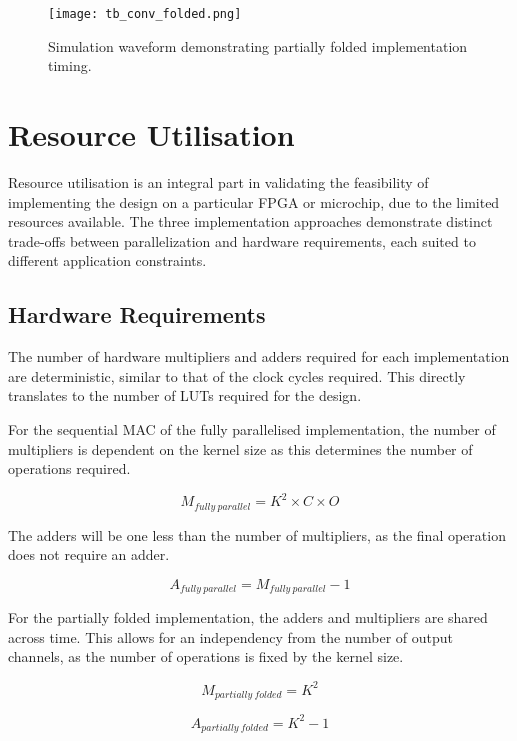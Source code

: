 \begin{figure}[h]
    \centering
    \texttt{[image: tb\_conv\_folded.png]}
    \caption{Simulation waveform demonstrating partially folded implementation timing.}
    \label{fig:sim_partial}
\end{figure}

\section{Resource Utilisation}
Resource utilisation is an integral part in validating the feasibility of implementing the design on a particular FPGA or microchip, due to the limited resources available. The three implementation approaches demonstrate distinct trade-offs between parallelization and hardware requirements, each suited to different application constraints.

\subsection{Hardware Requirements}
The number of hardware multipliers and adders required for each implementation are deterministic, similar to that of the clock cycles required.
This directly translates to the number of LUTs required for the design.

For the sequential MAC of the fully parallelised implementation, the number of multipliers is dependent on the kernel size as this determines the number of operations required.

\begin{equation}
    M_{fully\ parallel} = K^2 \times C \times O
\end{equation}

The adders will be one less than the number of multipliers, as the final operation does not require an adder.

\begin{equation}
    A_{fully\ parallel} = M_{fully\ parallel} - 1
\end{equation}

For the partially folded implementation, the adders and multipliers are shared across time. 
This allows for an independency from the number of output channels, as the number of operations is fixed by the kernel size.

\begin{equation}
    M_{partially\ folded} = K^2
\end{equation}

\begin{equation}
    A_{partially\ folded} = K^2 - 1
\end{equation}


